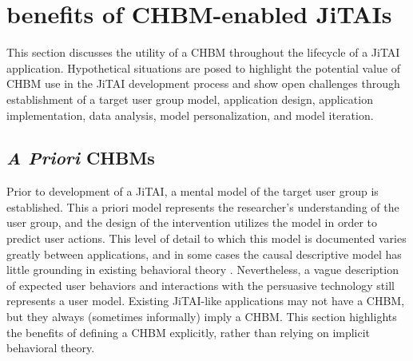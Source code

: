 \documentclass[runningheads,a4paper]{llncs}
\begin{document}

\section{benefits of CHBM-enabled JiTAIs}
This section discusses the utility of a CHBM throughout the lifecycle of a JiTAI application.
Hypothetical situations are posed to highlight the potential value of CHBM use in the JiTAI development process and show open challenges through establishment of a target user group model, application design, application implementation, data analysis, model personalization, and model iteration.

\subsection{\emph{A Priori} CHBMs}
Prior to development of a JiTAI, a mental model of the target user group is established.
This a priori model represents the researcher's understanding of the user group, and the design of the intervention utilizes the model in order to predict user actions.
This level of detail to which this model is documented varies greatly between applications, and in some cases the causal descriptive model has little grounding in existing behavioral theory \cite{prestwich2014does}.
Nevertheless, a vague description of expected user behaviors and interactions with the persuasive technology still represents a user model.
Existing JiTAI-like applications may not have a CHBM, but they always (sometimes informally) imply a CHBM.
This section highlights the benefits of defining a CHBM explicitly, rather than relying on implicit behavioral theory.
\end{document}
